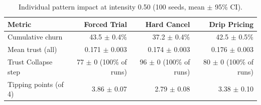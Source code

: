 \begin{table}[!t]
\centering
\caption{Individual pattern impact at intensity 0.50 (100 seeds, mean $\pm$ 95\% CI).}
\label{tab:per_pattern}
\begin{tabular}{lrrr}
\toprule
Metric & Forced Trial & Hard Cancel & Drip Pricing \\
\midrule
Cumulative churn & 43.5 $\pm$ 0.4\% & 37.2 $\pm$ 0.4\% & 42.5 $\pm$ 0.5\% \\
Mean trust (all) & 0.171 $\pm$ 0.003 & 0.174 $\pm$ 0.003 & 0.176 $\pm$ 0.003 \\
Trust Collapse step & 77 $\pm$ 0 (100\% of runs) & 96 $\pm$ 0 (100\% of runs) & 80 $\pm$ 0 (100\% of runs) \\
Tipping points (of 4) & 3.86 $\pm$ 0.07 & 2.79 $\pm$ 0.08 & 3.38 $\pm$ 0.10 \\
\bottomrule
\end{tabular}
\end{table}
